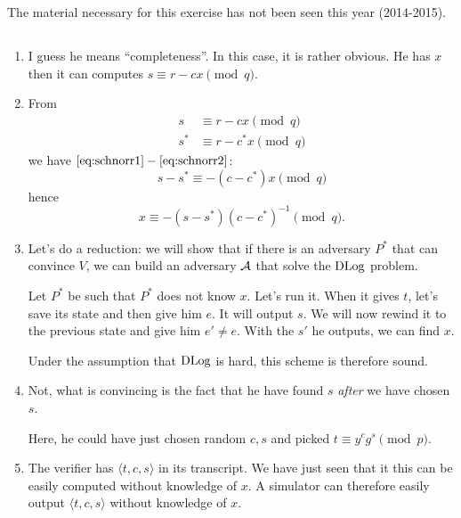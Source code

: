\section{}
\subsection{}
\begin{solution}
  The material necessary for this exercise has not been seen this year (2014-2015).
\end{solution}

\subsection{}
\begin{solution}
  \begin{enumerate}
    \item I guess he means ``completeness''.
      In this case, it is rather obvious.
      He has $x$ then it can computes $s \equiv r - cx \pmod{q}$.
    \item From
      \begin{align}
        \label{eq:schnorr1}
        s   & \equiv r - c  x \pmod{q}\\
        \label{eq:schnorr2}
        s^* & \equiv r - c^*x \pmod{q}
      \end{align}
      we have $\eqref{eq:schnorr1} - \eqref{eq:schnorr2}$:
      \[ s - s^* \equiv -(c - c^*)x \pmod{q} \]
      hence
      \[ x \equiv -(s - s^*)(c - c^*)^{-1} \pmod{q}. \]
    \item
      Let's do a reduction: we will show that if there is an
      adversary $P^*$ that can convince $V$, we can build an adversary $\mathcal{A}$ that solve the $\operatorname{DLog}$ problem.

      Let $P^*$ be such that $P^*$ does not know $x$.
      Let's run it.
      When it gives $t$, let's save its state and then give him $e$.
      It will output $s$.
      We will now rewind it to the previous state and give him $e' \neq e$.
      With the $s'$ he outputs, we can find $x$.

      Under the assumption that $\operatorname{DLog}$ is hard, this scheme is therefore sound.
    \item
      Not, what is convincing is the fact that he have found $s$ \emph{after} we have chosen
      $s$.

      Here, he could have just chosen random $c, s$ and picked $t \equiv y^cg^s \pmod{p}$.
    \item
      The verifier has $\langle t,c,s \rangle$ in its transcript.
      We have just seen that it this can be easily computed without knowledge of $x$.
      A simulator can therefore easily output $\langle t,c,s \rangle$ without knowledge of $x$.


\end{enumerate}
\end{solution}
